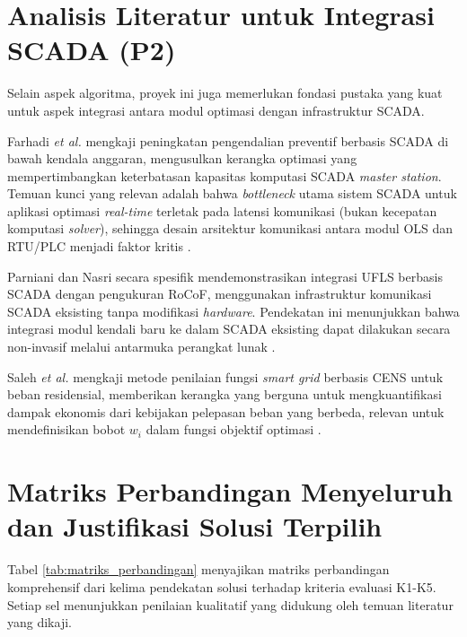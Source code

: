 \section{Analisis Literatur untuk Integrasi SCADA (P2)}
\label{sec:Analisis_Literatur_Integrasi_SCADA}

Selain aspek algoritma, proyek ini juga memerlukan fondasi pustaka yang kuat untuk aspek integrasi antara modul optimasi dengan infrastruktur SCADA.

Farhadi \textit{et al.} \cite{Farhadi2022} mengkaji peningkatan pengendalian preventif berbasis SCADA di bawah kendala anggaran, mengusulkan kerangka optimasi yang mempertimbangkan keterbatasan kapasitas komputasi SCADA \textit{master station}. Temuan kunci yang relevan adalah bahwa \textit{bottleneck} utama sistem SCADA untuk aplikasi optimasi \textit{real-time} terletak pada latensi komunikasi (bukan kecepatan komputasi \textit{solver}), sehingga desain arsitektur komunikasi antara modul OLS dan RTU/PLC menjadi faktor kritis \cite{Farhadi2022}.

Parniani dan Nasri \cite{Parniani2006} secara spesifik mendemonstrasikan integrasi UFLS berbasis SCADA dengan pengukuran RoCoF, menggunakan infrastruktur komunikasi SCADA eksisting tanpa modifikasi \textit{hardware}. Pendekatan ini menunjukkan bahwa integrasi modul kendali baru ke dalam SCADA eksisting dapat dilakukan secara non-invasif melalui antarmuka perangkat lunak \cite{Parniani2006}.

Saleh \textit{et al.} \cite{Saleh2022} mengkaji metode penilaian fungsi \textit{smart grid} berbasis CENS untuk beban residensial, memberikan kerangka yang berguna untuk mengkuantifikasi dampak ekonomis dari kebijakan pelepasan beban yang berbeda, relevan untuk mendefinisikan bobot $w_{i}$ dalam fungsi objektif optimasi \cite{Saleh2022}.

\section{Matriks Perbandingan Menyeluruh dan Justifikasi Solusi Terpilih}
\label{sec:Matriks_Perbandingan_Menyeluruh}

Tabel \ref{tab:matriks_perbandingan} menyajikan matriks perbandingan komprehensif dari kelima pendekatan solusi terhadap kriteria evaluasi K1-K5. Setiap sel menunjukkan penilaian kualitatif yang didukung oleh temuan literatur yang dikaji.

